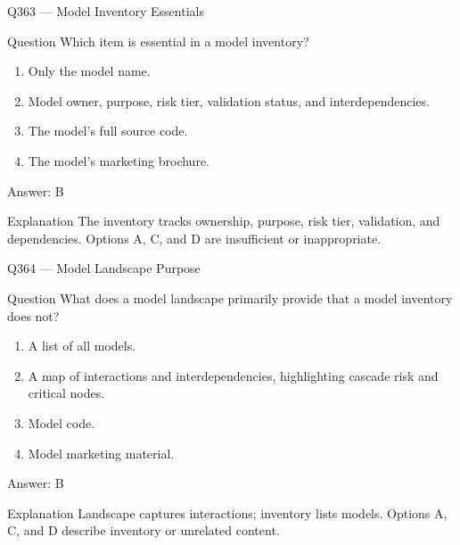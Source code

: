 \documentclass[aspectratio=169,8pt]{beamer}
\begin{document}
	\begin{frame}{Q363 --- Model Inventory Essentials}
		\begin{block}{Question}
			Which item is essential in a model inventory?
			\begin{enumerate}
				\item Only the model name.
				\item Model owner, purpose, risk tier, validation status, and interdependencies.
				\item The model's full source code.
				\item The model's marketing brochure.
			\end{enumerate}
		\end{block}
		\begin{exampleblock}{Answer: B}\end{exampleblock}
		\begin{block}{Explanation}
			The inventory tracks ownership, purpose, risk tier, validation, and dependencies. Options A, C, and D are insufficient or inappropriate.
		\end{block}
	\end{frame}
	
	\begin{frame}{Q364 --- Model Landscape Purpose}
		\begin{block}{Question}
			What does a model landscape primarily provide that a model inventory does not?
			\begin{enumerate}
				\item A list of all models.
				\item A map of interactions and interdependencies, highlighting cascade risk and critical nodes.
				\item Model code.
				\item Model marketing material.
			\end{enumerate}
		\end{block}
		\begin{exampleblock}{Answer: B}\end{exampleblock}
		\begin{block}{Explanation}
			Landscape captures interactions; inventory lists models. Options A, C, and D describe inventory or unrelated content.
		\end{block}
	\end{frame}
	
\end{document}
